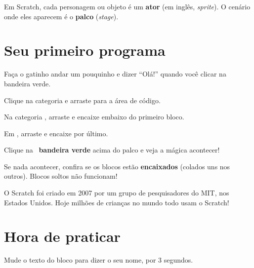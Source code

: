 \begin{vocabulario}
Em Scratch, cada personagem ou objeto é um \textbf{ator} (em inglês, \textit{sprite}). O cenário onde eles aparecem é o \textbf{palco} (\textit{stage}).
\end{vocabulario}

\section{Seu primeiro programa}

\begin{missao}
Faça o gatinho andar um pouquinho e dizer ``Olá!'' quando você clicar na bandeira verde.
\end{missao}

\begin{passos}
\item Clique na categoria  e arraste  para a área de código.
\item Na categoria , arraste  e encaixe embaixo do primeiro bloco.
\item Em , arraste  e encaixe por último.
\item Clique na \bandeira\ \textbf{bandeira verde} acima do palco e veja a mágica acontecer!
\end{passos}

\begin{cuidado}
Se nada acontecer, confira se os blocos estão \textbf{encaixados} (colados uns nos outros). Blocos soltos não funcionam!
\end{cuidado}

\begin{curiosidade}
O Scratch foi criado em 2007 por um grupo de pesquisadores do MIT, nos Estados Unidos. Hoje milhões de crianças no mundo todo usam o Scratch!
\end{curiosidade}

\section{Hora de praticar}

\begin{exercicio}
Mude o texto do bloco  para dizer o seu nome, por 3 segundos.
\end{exercicio}

